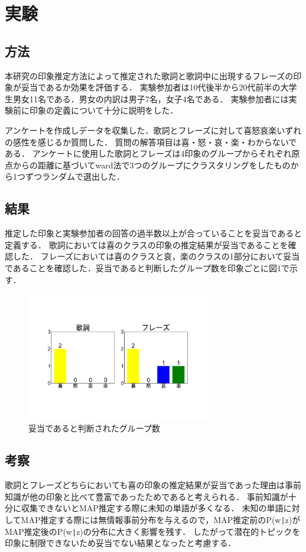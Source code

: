 \documentclass[a4paper,10pt,twocolumn]{jsarticle}
\begin{document}
\section{実験}
\subsection{方法}
本研究の印象推定方法によって推定された歌詞と歌詞中に出現するフレーズの印象が妥当であるか効果を評価する．
実験参加者は10代後半から20代前半の大学生男女11名である．男女の内訳は男子7名，女子4名である．
実験参加者には実験前に印象の定義について十分に説明をした．

アンケートを作成しデータを収集した．歌詞とフレーズに対して喜怒哀楽いずれの感性を感じるか質問した．
質問の解答項目は喜・怒・哀・楽・わからないである．
アンケートに使用した歌詞とフレーズは4印象のグループからそれぞれ原点からの距離に基づいてward法で3つのグループにクラスタリングをしたものから1つずつランダムで選出した．

\subsection{結果}
推定した印象と実験参加者の回答の過半数以上が合っていることを妥当であると定義する．
歌詞においては喜のクラスの印象の推定結果が妥当であることを確認した．
フレーズにおいては喜のクラスと哀，楽のクラスの1部分において妥当であることを確認した．妥当であると判断したグループ数を印象ごとに図1で示す．
\begin{figure}[b]
    \centering
    \includegraphics[angle=-90,width=8cm]{result.pdf}
    \vspace{0mm}
    \caption{妥当であると判断されたグループ数}
    \label{fig:mms}
    \vspace{5mm}
\end{figure}
\subsection{考察}
歌詞とフレーズどちらにおいても喜の印象の推定結果が妥当であった理由は事前知識が他の印象と比べて豊富であったためであると考えられる．
事前知識が十分に収集できないとMAP推定する際に未知の単語が多くなる．
未知の単語に対してMAP推定する際には無情報事前分布を与えるので，MAP推定前のP(w\verb+|+z)がMAP推定後のP(w\verb+|+z)の分布に大きく影響を残す．
したがって潜在的トピックを印象に制限できないため妥当でない結果となったと考慮する．

%
\end{document}
